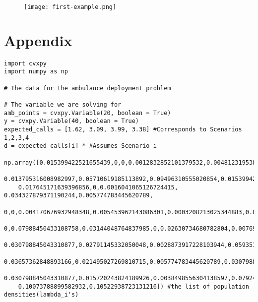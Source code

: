 \documentclass{article}
\newenvironment{code}{\captionsetup{type=listing}}{}
\begin{document}
\begin{figure}
    \centering
    \texttt{[image: first-example.png]}
        \label{fig:my_label}
\end{figure}

\section{Appendix}
\begin{code}
\begin{verbatim}
import cvxpy
import numpy as np

# The data for the ambulance deployment problem

# The variable we are solving for
amb_points = cvxpy.Variable(20, boolean = True)
y = cvxpy.Variable(40, boolean = True)
expected_calls = [1.62, 3.09, 3.99, 3.38] #Corresponds to Scenarios 1,2,3,4
d = expected_calls[i] * #Assumes Scenario i
    np.array([0.015399422521655439,0,0,0.0012832852101379532,0.004812319538017324,
    0.013795316008982997,0.05710619185113892,0.09496310555020854,0.015399422521655439,
    0.017645171639396856,0,0.0016041065126724415, 0.034327879371190244,0.005774783445620789,
    0,0,0.004170676932948348,0.005453962143086301,0.0003208213025344883,0.03144048764837985,
    0,0.07988450433108758,0.03144048764837985,0,0.02630734680782804,0.007699711260827719,
    0.030798845043310877,0.02791145332050048,0.0028873917228103944,0.059351940968880336,
    0.03657362848893166,0.021495027269810715,0.005774783445620789,0.030798845043310877,
    0.030798845043310877,0.015720243824189926,0.0038498556304138597,0.0792428617260186,
    0.10073788899582932,0.10522938723131216]) #the list of population densities(lambda_i's) 


\end{verbatim}
\end{code}
\end{document}
